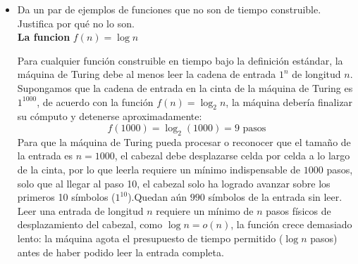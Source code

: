 \begin{itemize}
El número total de transiciones ejecutadas hasta la parada es $T(n) = n \cdot n \cdot n = n^3.$ La máquina se detiene en exactamente $n^3$ pasos, $f(n) = n^3$ es construible en tiempo.\\

Para $f(n) = n!$, se puede suponer una máquina M que utiliza la cadena de entrada $1^n$ para controlar las llamadas anidadas de $n$ niveles de profundidad.\\

En la $m$-ésima iteración del bucle, multiplicamos $(m-1)!$ por $m$. El número de bits necesarios para representar $(m-1)!$ es $O(m \log m)$, y el número de bits para $m$ es $O(\log m)$, multiplicarlos seria $O((m \log m) \cdot \log m) = O(m \log^2 m)$ pasos.\\

Sumamos los costos $T(n) = \sum_{m=1}^{n} O(m \log^2 m) = O(n^2 \log^2 n)$, entonces $f(n) = n!$ es construible en tiempo.\cite{blais2026time}
    
    \item Da un par de ejemplos de funciones que no son de tiempo construible. Justifica por qué no lo son.\\

\textbf{La funcion} $f(n) = \log n$

    Para cualquier función construible en tiempo bajo la definición estándar, la máquina de Turing debe al menos leer la cadena de entrada $1^n$ de longitud $n$.\\
    
    Supongamos que la cadena de entrada en la cinta de la máquina de Turing es $1^{1000}$, de acuerdo con la función $f(n) = \log_2 n$, la máquina debería finalizar su cómputo y detenerse aproximadamente:$$f(1000) = \log_2(1000) = 9 \text{ pasos}$$Para que la máquina de Turing pueda procesar o reconocer que el tamaño de la entrada es $n = 1000$, el cabezal debe desplazarse celda por celda a lo largo de la cinta, por lo que leerla requiere un mínimo indispensable de $1000$ pasos, solo que al llegar al paso 10, el cabezal solo ha logrado avanzar sobre los primeros 10 símbolos ($1^{10}$).Quedan aún $990$ símbolos de la entrada sin leer.\\
    
    Leer una entrada de longitud $n$ requiere un mínimo de $n$ pasos físicos de desplazamiento del cabezal, 
    como $\log n = o(n)$, la función crece demasiado lento: la máquina agota el presupuesto de tiempo permitido ($\log n$ pasos) antes de haber podido leer la entrada completa.\\


\end{itemize}
